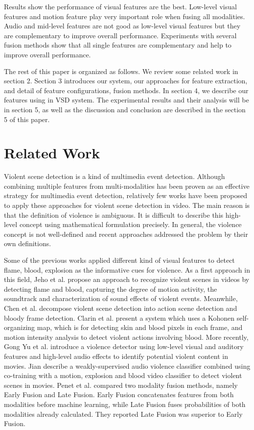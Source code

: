 \documentclass[twocolumn]{bmcart}%
\begin{document}
Results show the performance of visual features are the best. Low-level visual features and motion feature play very important role when fusing all modalities. Audio and mid-level features are not good as low-level visual features but they are complementary to improve overall performance. Experiments with several fusion methods show that all single features are complementary and help to improve overall performance.

The rest of this paper is organized as follows. We review some related work in section 2. Section 3 introduces our system, our approaches for feature extraction, and detail of feature configurations, fusion methods. In section 4, we describe our features using in VSD system. The experimental results and their analysis will be in section 5, as well as the discussion and conclusion are described in the section 5 of this paper.
\section{Related Work}
Violent scene detection is a kind of multimedia event detection. Although combining multiple features from multi-modalities has been proven as an effective strategy for multimedia event detection, relatively few works have been proposed to apply these approaches for violent scene detection in video. The main reason is that the definition of violence is ambiguous. It is difficult to describe this high-level concept using mathematical formulation precisely. In general, the violence concept is not well-defined and recent approaches addressed the problem by their own definitions.

Some of the previous works applied different kind of visual features to detect flame, blood, explosion as the informative cues for violence. As a first approach in this field, Jeho et al.\cite{nam1998audio} propose an approach to recognize violent scenes in videos by detecting flame and blood, capturing the degree of motion activity, the soundtrack and characterization of sound effects of violent events. Meanwhile, Chen et al.\cite{2} decompose violent scene detection into action scene detection and bloody frame detection. Clarin et al.\cite{3} present a system which uses a Kohonen self-organizing map, which is for detecting skin and blood pixels in each frame, and motion intensity analysis to detect violent actions involving blood. More recently, Gong Yu et al.\cite{11} introduce a violence detector using low-level visual and auditory features and high-level audio effects to identify potential violent content in movies. Jian \cite{17} describe a weakly-supervised audio violence classifier combined using co-training with a motion, explosion and blood video classifier to detect violent scenes in movies. Penet et al.\cite{21} compared two modality fusion methods, namely Early Fusion and Late Fusion. Early Fusion concatenates features from both modalities before machine learning, while Late Fusion fuses probabilities of both modalities already calculated. They reported Late Fusion was superior to Early Fusion.
\end{document}
